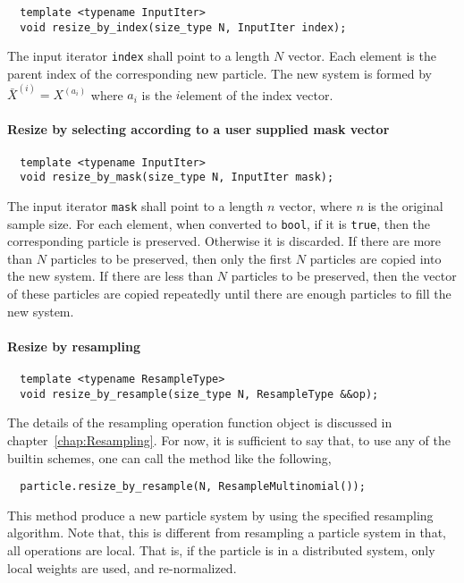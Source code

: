 \begin{Verbatim}
  template <typename InputIter>
  void resize_by_index(size_type N, InputIter index);
\end{Verbatim}
The input iterator \verb|index| shall point to a length $N$ vector. Each
element is the parent index of the corresponding new particle. The new system
is formed by $\bar{X}^{(i)} = X^{(a_i)}$ where $a_i$ is the $i$\ith element of
the index vector.

\paragraph{Resize by selecting according to a user supplied mask vector}

\begin{Verbatim}
  template <typename InputIter>
  void resize_by_mask(size_type N, InputIter mask);
\end{Verbatim}
The input iterator \verb|mask| shall point to a length $n$ vector, where $n$ is
the original sample size. For each element, when converted to \verb|bool|, if
it is \verb|true|, then the corresponding particle is preserved. Otherwise it
is discarded. If there are more than $N$ particles to be preserved, then only
the first $N$ particles are copied into the new system. If there are less than
$N$ particles to be preserved, then the vector of these particles are copied
repeatedly until there are enough particles to fill the new system.

\paragraph{Resize by resampling}

\begin{Verbatim}
  template <typename ResampleType>
  void resize_by_resample(size_type N, ResampleType &&op);
\end{Verbatim}
The details of the resampling operation function object is discussed in
chapter~\ref{chap:Resampling}. For now, it is sufficient to say that, to use
any of the builtin schemes, one can call the method like the following,
\begin{Verbatim}
  particle.resize_by_resample(N, ResampleMultinomial());
\end{Verbatim}
This method produce a new particle system by using the specified resampling
algorithm. Note that, this is different from resampling a particle system in
that, all operations are local. That is, if the particle is in a distributed
system, only local weights are used, and re-normalized.

